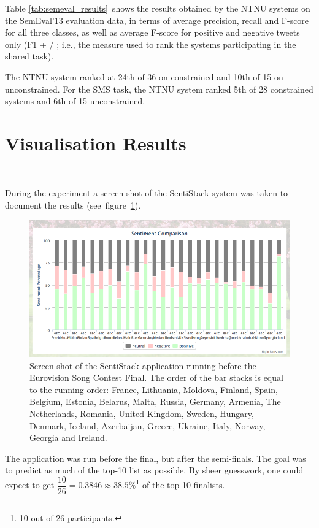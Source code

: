 Table \ref{tab:semeval_results}~shows the results obtained by the NTNU systems on the SemEval'13 evaluation data, in terms of average precision, recall and F-score for all three classes, as well as average F-score for positive and negative tweets only (F1 + / \textendash; i.e., the measure used to rank the systems participating in the shared task).

The NTNU system ranked at 24th of 36 on constrained and 10th of 15 on unconstrained. For the SMS task, the NTNU system ranked 5th of 28 constrained systems and 6th of 15 unconstrained.


\section{Visualisation Results}~\label{sec:esc_result}

During the experiment a screen shot of the SentiStack system was taken to document the results (see~figure~\ref{fig:sentistack_esc}).

\begin{figure}[htb!]
	\centering
	\includegraphics[width=\linewidth]{../img/sentistack_esc.png}
	\caption[SentiStack running before the Eurovision Song Contest Final]{Screen shot of the SentiStack application running before the Eurovision Song Contest Final. The order of the bar stacks is equal to the running order: France, Lithuania, Moldova, Finland, Spain, Belgium, Estonia, Belarus, Malta, Russia, Germany, Armenia, The Netherlands, Romania, United Kingdom, Sweden, Hungary, Denmark, Iceland, Azerbaijan, Greece, Ukraine, Italy, Norway, Georgia and Ireland.}
	\label{fig:sentistack_esc}
\end{figure}

The application was run before the final, but after the semi-finals. The goal was to predict as much of the top-10 list as possible. By sheer guesswork, one could expect to get $\dfrac{10}{26} = 0.3846 \approx 38.5\%$\footnote{10 out of 26 participants.} of the top-10 finalists. 

